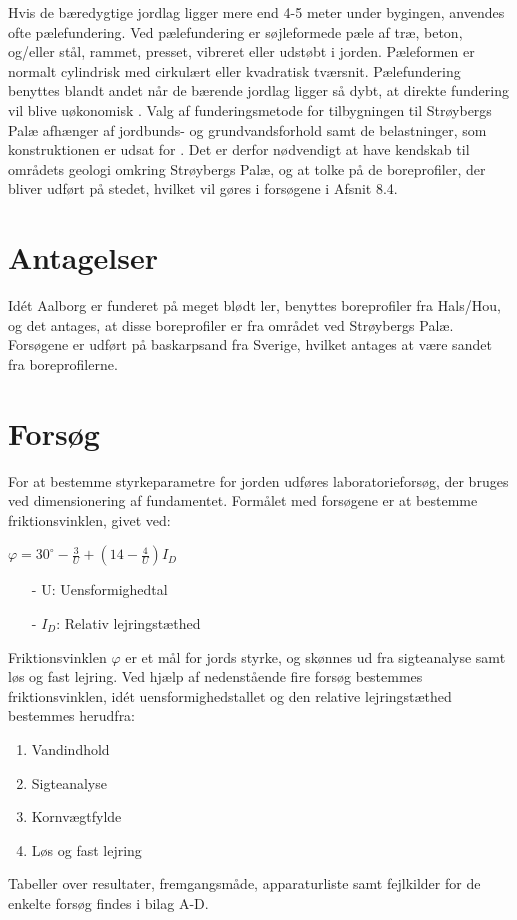 \indent{     }  Hvis de bæredygtige jordlag ligger mere end 4-5 meter under bygingen, anvendes ofte pælefundering. Ved pælefundering er søjleformede pæle af træ, beton, og/eller stål, rammet, presset, vibreret eller udstøbt i jorden. Pæleformen er normalt cylindrisk med cirkulært eller kvadratisk tværsnit. Pælefundering benyttes blandt andet når de bærende jordlag ligger så dybt, at direkte fundering vil blive uøkonomisk \citep[ s. 355]{geoteknik}.
\newline
\newline
Valg af funderingsmetode for tilbygningen til Strøybergs Palæ afhænger af jordbunds- og grundvandsforhold samt de belastninger, som konstruktionen er udsat for \citep[ s. 355]{geoteknik}. Det er derfor nødvendigt at have kendskab til områdets geologi omkring Strøybergs Palæ, og at tolke på de boreprofiler, der bliver udført på stedet, hvilket vil gøres i forsøgene i Afsnit 8.4. 

\section{Antagelser}
Idét Aalborg er funderet på meget blødt ler, benyttes boreprofiler fra Hals/Hou, og det antages, at disse boreprofiler er fra området ved Strøybergs Palæ. 
\newline \indent{     }  Forsøgene er udført på baskarpsand fra Sverige, hvilket antages at være sandet fra boreprofilerne.

\section{Forsøg}
For at bestemme styrkeparametre for jorden udføres laboratorieforsøg, der bruges ved dimensionering af fundamentet.
\newline
\newline
Formålet med forsøgene er at bestemme friktionsvinklen, givet ved: 

\begin{center}
	$\varphi = 30^\circ - \frac{3}{U} + (14 - \frac{4}{U}) I_D$
\end{center}

\begin{itemize}
	\item[-] U: Uensformighedtal
	\item[-] $I_D$: Relativ lejringstæthed
\end{itemize}

Friktionsvinklen $\varphi$ er et mål for jords styrke, og skønnes ud fra sigteanalyse samt løs og fast lejring. Ved hjælp af nedenstående fire forsøg bestemmes friktionsvinklen, idét uensformighedstallet og den relative lejringstæthed bestemmes herudfra: 
\begin{enumerate}
	\item Vandindhold
	\item Sigteanalyse
	\item Kornvægtfylde
	\item Løs og fast lejring
\end{enumerate}
Tabeller over resultater, fremgangsmåde, apparaturliste samt fejlkilder for de enkelte forsøg findes i bilag A-D.


